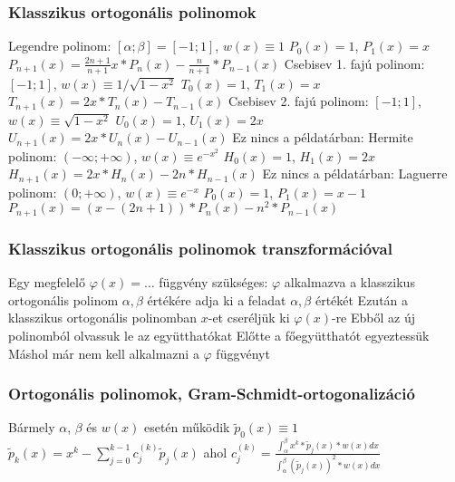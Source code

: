 \documentclass[12pt,a4paper]{article}
\begin{document}
\subsubsection{Klasszikus ortogonális polinomok}

\begin{outline}
	\1 Legendre polinom: $[\alpha;\beta]=[-1;1]$, $w(x) \equiv 1$
		\2 $P_0(x) = 1$, $P_1(x) = x$
		\2 $P_{n+1}(x) = \frac{2n+1}{n+1}x * P_n(x) - \frac{n}{n+1} * P_{n-1}(x)$
	\1 Csebisev 1. fajú polinom: $[-1;1]$, $w(x) \equiv 1/\sqrt{1-x^2}$
		\2 $T_0(x) = 1$, $T_1(x) = x$
		\2 $T_{n+1}(x) = 2x * T_n(x) - T_{n-1}(x)$
	\1 Csebisev 2. fajú polinom: $[-1;1]$, $w(x) \equiv \sqrt{1-x^2}$
		\2 $U_0(x) = 1$, $U_1(x) = 2x$
		\2 $U_{n+1}(x) = 2x * U_n(x) - U_{n-1}(x)$
	\1 Ez nincs a példatárban: Hermite polinom: $(-\infty;+\infty)$, $w(x) \equiv e^{-x^2}$
		\2 $H_0(x) = 1$, $H_1(x) = 2x$
		\2 $H_{n+1}(x) = 2x * H_n(x) - 2n* H_{n-1}(x)$
	\1 Ez nincs a példatárban: Laguerre polinom: $(0;+\infty)$, $w(x) \equiv e^{-x}$
		\2 $P_0(x) = 1$, $P_1(x) = x-1$
		\2 $P_{n+1}(x) = (x-(2n+1))*P_n(x)-n^2*P_{n-1}(x)$
\end{outline}

\pagebreak

\subsubsection{Klasszikus ortogonális polinomok transzformációval}

\begin{outline}
	\1 Egy megfelelő $\varphi(x) = \dots$ függvény szükséges: $\varphi$ alkalmazva a klasszikus ortogonális polinom $\alpha,\beta$ értékére adja ki a feladat $\alpha,\beta$ értékét
	\1 Ezután a klasszikus ortogonális polinomban $x$-et cseréljük ki $\varphi(x)$-re
	\1 Ebből az új polinomból olvassuk le az együtthatókat
		\2 Előtte a főegyütthatót egyeztessük
		\2 Máshol már nem kell alkalmazni a $\varphi$ függvényt
\end{outline}

\subsubsection{Ortogonális polinomok, Gram-Schmidt-ortogonalizáció}

\begin{outline}
	\1 Bármely $\alpha$, $\beta$ és $w(x)$ esetén működik
	\1 $\widetilde{p}_0(x) \equiv 1$
	\1 $\widetilde{p}_k(x) = x^k - \sum_{j=0}^{k-1} c_j^{(k)} \widetilde{p}_j(x)$ ahol $c_j^{(k)}=\frac{\int_{\alpha}^{\beta} x^k * \widetilde{p}_j(x) * w(x) dx}
	{\int_{\alpha}^{\beta} (\widetilde{p}_j(x))^2 * w(x) dx}$
\end{outline}
\end{document}

